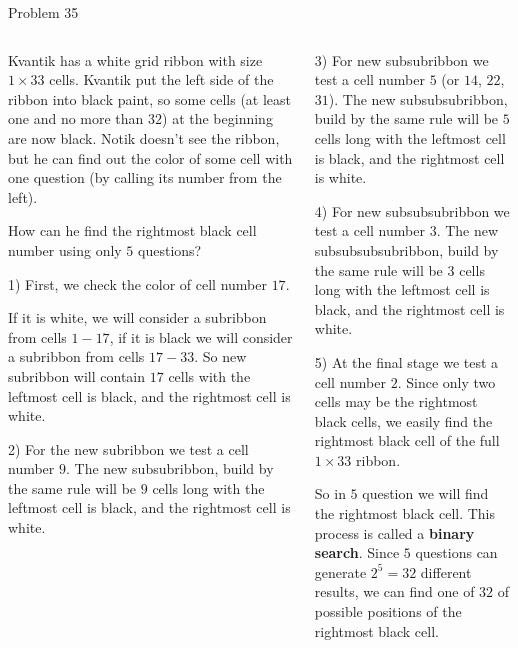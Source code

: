 \documentclass[9pt,aspectratio=169]{beamer}
\begin{document}
\begin{frame}{Problem 35}
  \begin{columns}[T]
    \begin{column}{0.5\textwidth}
      \begin{problem}
        Kvantik has a white grid ribbon with size $1 \times 33$ cells. Kvantik put the left side of the ribbon into black paint, so some cells (at least one and no more than $32$) at the beginning are now black. Notik doesn't see the ribbon, but he can find out the color of some cell with one question (by calling its number from the left). 

        How can he find the rightmost black cell number using only $5$ questions?
      \end{problem}
      1) First, we check the color of cell number $17$.

      If it is white, we will consider a subribbon from cells $1-17$, if it is black we will consider a subribbon from cells $17-33$. So new subribbon will contain $17$ cells with the leftmost cell is black, and the rightmost cell is white.

      2) For the new subribbon we test a cell number $9$. The new subsubribbon, build by the same rule will be $9$ cells long with the leftmost cell is black, and the rightmost cell is white.
    \end{column}
    \begin{column}{0.5\textwidth}
      3) For new subsubribbon we test a cell number $5$ (or $14$, $22$, $31$). The new subsubsubribbon, build by the same rule will be $5$ cells long with the leftmost cell is black, and the rightmost cell is white.

      4) For new subsubsubribbon we test a cell number $3$. The new subsubsubsubribbon, build by the same rule will be $3$ cells long with the leftmost cell is black, and the rightmost cell is white.

      5) At the final stage we test a cell number $2$. Since only two cells may be the rightmost black cells, we easily find the rightmost black cell of the full $1\times 33$ ribbon.

      So in $5$ question we will find the rightmost black cell. This process is called a \textbf{binary search}. Since $5$ questions can generate $2^5=32$ different results, we can find one of $32$ of possible positions of the rightmost black cell.
    \end{column}
  \end{columns}
\end{frame}

\end{document}
